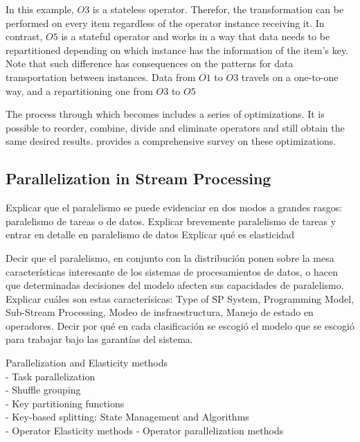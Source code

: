 
  In this example, $O3$ is a stateless operator. Therefor, the transformation
  can be performed on every item regardless of the operator instance receiving
  it. In contrast, $O5$ is a stateful operator and works in a way that data
  needs to be repartitioned depending on which instance has the information of
  the item's key. Note that such difference has consequences on the patterns
  for data transportation between instances. Data from $O1$ to $O3$ travels on
  a one-to-one way, and a repartitioning one from $O3$ to $O5$

  The process through which  becomes 
  includes a series of optimizations. It is possible to reorder, combine,
  divide and eliminate operators and still obtain the same desired results.
  \cite{Hirzel_2014} provides a comprehensive survey on these optimizations.

  \subsection{Parallelization in Stream Processing}

  Explicar que el paralelismo se puede evidenciar en dos modos a grandes
  rasgos: paralelismo de tareas o de datos. Explicar brevemente paralelismo de
  tareas y entrar en detalle en paralelismo de datos
  Explicar qué es elasticidad

  Decir que el paralelismo, en conjunto con la distribución ponen sobre la mesa
  características interesante de los sistemas de procesamientos de datos, o
  hacen que determinadas decisiones del modelo afecten sus capacidades de
  paralelismo. Explicar cuáles son estas caracterísicas: Type of SP System,
  Programming Model, Sub-Stream Processing, Modeo de insfraestructura, Manejo
  de estado en operadores. \cite{R_ger_2019} Decir por qué en cada
  clasificación se escogió el modelo que se escogió para trabajar bajo las
  garantías del sistema.


  Parallelization and Elasticity methods \cite{R_ger_2019}\\
  - Task parallelization \cite{R_ger_2019}\\
  - Shuffle grouping \cite{R_ger_2019}\\
  - Key partitioning functions \cite{R_ger_2019}\\
  - Key-based splitting: State Management and Algorithms \cite{R_ger_2019}\\
  - Operator Elasticity methods \cite{R_ger_2019}
  - Operator parallelization methods \cite{R_ger_2019}

